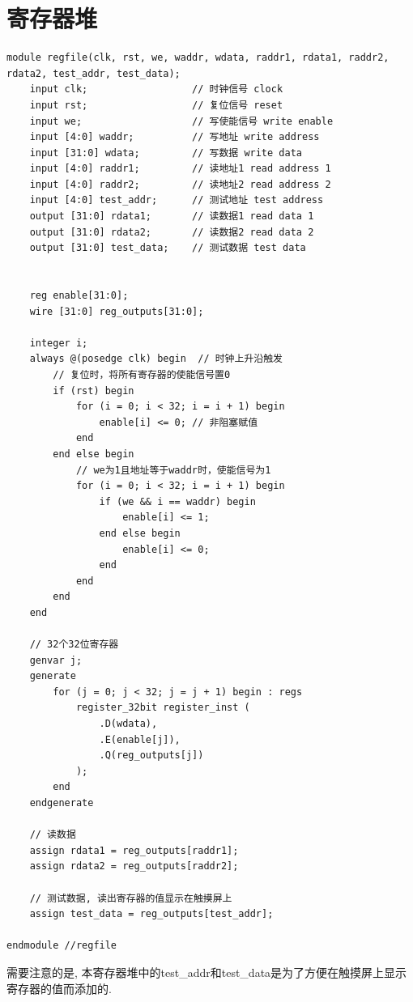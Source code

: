 \documentclass[AutoFakeBold]{LZUThesis}
\begin{document}
\section{寄存器堆}
\begin{lstlisting}[style={verilog-style}]
module regfile(clk, rst, we, waddr, wdata, raddr1, rdata1, raddr2, rdata2, test_addr, test_data);
    input clk;                  // 时钟信号 clock
    input rst;                  // 复位信号 reset
    input we;                   // 写使能信号 write enable
    input [4:0] waddr;          // 写地址 write address
    input [31:0] wdata;         // 写数据 write data
    input [4:0] raddr1;         // 读地址1 read address 1
    input [4:0] raddr2;         // 读地址2 read address 2
    input [4:0] test_addr;      // 测试地址 test address
    output [31:0] rdata1;       // 读数据1 read data 1
    output [31:0] rdata2;       // 读数据2 read data 2
    output [31:0] test_data;    // 测试数据 test data
    

    reg enable[31:0];
    wire [31:0] reg_outputs[31:0];

    integer i;
    always @(posedge clk) begin  // 时钟上升沿触发
        // 复位时，将所有寄存器的使能信号置0
        if (rst) begin
            for (i = 0; i < 32; i = i + 1) begin
                enable[i] <= 0; // 非阻塞赋值
            end
        end else begin
            // we为1且地址等于waddr时，使能信号为1
            for (i = 0; i < 32; i = i + 1) begin
                if (we && i == waddr) begin
                    enable[i] <= 1;
                end else begin
                    enable[i] <= 0;
                end
            end
        end
    end

    // 32个32位寄存器
    genvar j;
    generate
        for (j = 0; j < 32; j = j + 1) begin : regs
            register_32bit register_inst (
                .D(wdata),
                .E(enable[j]),
                .Q(reg_outputs[j])
            );
        end
    endgenerate

    // 读数据
    assign rdata1 = reg_outputs[raddr1];
    assign rdata2 = reg_outputs[raddr2];

    // 测试数据, 读出寄存器的值显示在触摸屏上
    assign test_data = reg_outputs[test_addr];

endmodule //regfile

\end{lstlisting}

需要注意的是, 本寄存器堆中的test\_addr和test\_data是为了方便在触摸屏上显示寄存器的值而添加的.
\end{document}
